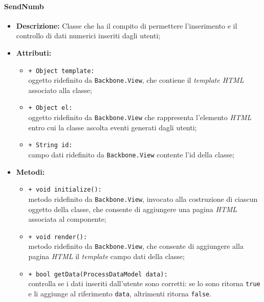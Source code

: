 \paragraph{SendNumb}
\begin{flushleft}
\begin{itemize}
\item \textbf{Descrizione:} Classe che ha il compito di permettere l'inserimento e il controllo di dati numerici inseriti dagli utenti;
\item \textbf{Attributi:}
\begin{sloppypar}
\begin{itemize}
\item \texttt{+ Object template:}\\ oggetto ridefinito da \texttt{Backbone.View}, che contiene il \textit{template HTML} associato alla classe;
\item \texttt{+ Object el:}\\ oggetto ridefinito da \texttt{Backbone.View} che rappresenta l'elemento \textit{HTML} entro cui la classe ascolta eventi generati dagli utenti;
\item \texttt{+ String id:}\\ campo dati ridefinito da \texttt{Backbone.View} contente l'id della classe;
\end{itemize}
\end{sloppypar}
\item \textbf{Metodi:}
\begin{sloppypar}
\begin{itemize}
\item \texttt{+ void initialize():}\\ metodo ridefinito da \texttt{Backbone.View}, invocato alla costruzione di ciascun oggetto della classe, che consente di aggiungere una pagina \textit{HTML} associata al componente;
\item \texttt{+ void render():}\\ metodo ridefinito da \texttt{Backbone.View}, che consente di aggiungere alla pagina \textit{HTML} il \textit{template} campo dati della classe;
\item \texttt{+ bool getData(ProcessDataModel data):}\\ controlla se i dati inseriti dall'utente sono corretti: se lo sono ritorna \texttt{true} e li aggiunge al riferimento \texttt{data}, altrimenti ritorna \texttt{false}.
\end{itemize}
\end{sloppypar}
\end{itemize}
\end{flushleft}

